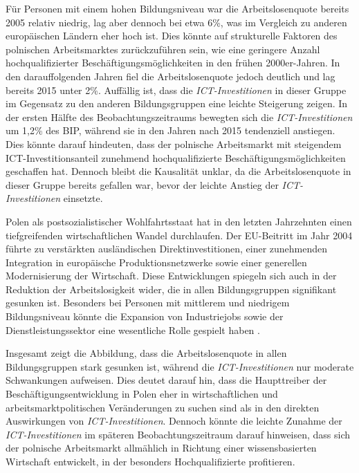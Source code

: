 Für Personen mit einem hohen Bildungsniveau war die Arbeitslosenquote bereits 
2005 relativ niedrig, lag aber dennoch bei etwa 6\%, was im Vergleich zu anderen 
europäischen Ländern eher hoch ist. Dies könnte auf strukturelle Faktoren des 
polnischen Arbeitsmarktes zurückzuführen sein, wie eine geringere Anzahl 
hochqualifizierter Beschäftigungsmöglichkeiten in den frühen 2000er-Jahren. In den 
darauffolgenden Jahren fiel die Arbeitslosenquote jedoch deutlich und lag bereits 
2015 unter 2\%. Auffällig ist, dass die \textit{\ac{ICT}-Investitionen} in dieser 
Gruppe im Gegensatz zu den anderen Bildungsgruppen eine leichte Steigerung zeigen. 
In der ersten Hälfte des Beobachtungszeitraums bewegten sich die 
\textit{\ac{ICT}-Investitionen} um 1,2\% des BIP, während sie in den Jahren nach 
2015 tendenziell anstiegen. Dies könnte darauf hindeuten, dass der polnische 
Arbeitsmarkt mit steigendem ICT-Investitionsanteil zunehmend hochqualifizierte 
Beschäftigungsmöglichkeiten geschaffen hat. Dennoch bleibt die Kausalität unklar, 
da die Arbeitslosenquote in dieser Gruppe bereits gefallen war, bevor der leichte 
Anstieg der \textit{\ac{ICT}-Investitionen} einsetzte.

Polen als postsozialistischer Wohlfahrtsstaat hat in den letzten Jahrzehnten einen 
tiefgreifenden wirtschaftlichen Wandel durchlaufen. Der EU-Beitritt im Jahr 2004 
führte zu verstärkten ausländischen Direktinvestitionen, einer zunehmenden 
Integration in europäische Produktionsnetzwerke sowie einer generellen 
Modernisierung der Wirtschaft. Diese Entwicklungen spiegeln sich auch in der 
Reduktion der Arbeitslosigkeit wider, die in allen Bildungsgruppen signifikant 
gesunken ist. Besonders bei Personen mit mittlerem und niedrigem Bildungsniveau 
könnte die Expansion von Industriejobs sowie der Dienstleistungssektor eine 
wesentliche Rolle gespielt haben \parencite[vgl.][S. 455–459]{myant2013transition}.

Insgesamt zeigt die Abbildung, dass die Arbeitslosenquote in allen Bildungsgruppen 
stark gesunken ist, während die \textit{\ac{ICT}-Investitionen} nur moderate 
Schwankungen aufweisen. Dies deutet darauf hin, dass die Haupttreiber der 
Beschäftigungsentwicklung in Polen eher in wirtschaftlichen und 
arbeitsmarktpolitischen Veränderungen zu suchen sind als in den direkten 
Auswirkungen von \textit{\ac{ICT}-Investitionen}. Dennoch könnte die leichte 
Zunahme der \textit{\ac{ICT}-Investitionen} im späteren Beobachtungszeitraum 
darauf hinweisen, dass sich der polnische Arbeitsmarkt allmählich in Richtung 
einer wissensbasierten Wirtschaft entwickelt, in der besonders Hochqualifizierte 
profitieren.

